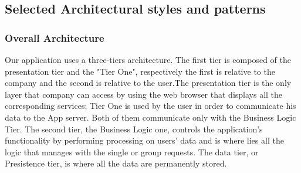 \documentclass{article}
\begin{document}
\subsection{Selected Architectural styles and patterns}
\subsubsection{Overall Architecture}
Our application uses a three-tiers architecture. \newline
The first tier is composed of the presentation tier and the "Tier One", respectively the first is relative to the company and the second is relative to the user.The presentation tier is the only layer that company can access by using the web browser that displays all the corresponding services; Tier One is used by the user in order to communicate his data to the App server. Both of them communicate only with the Business Logic Tier. \newline
The second tier, the Business Logic one, controls the application's functionality by performing processing on users' data and is where lies all the logic that manages with the single or group requests. \newline
The data tier, or Presistence tier, is where all the data are permanently stored.
\end{document}

